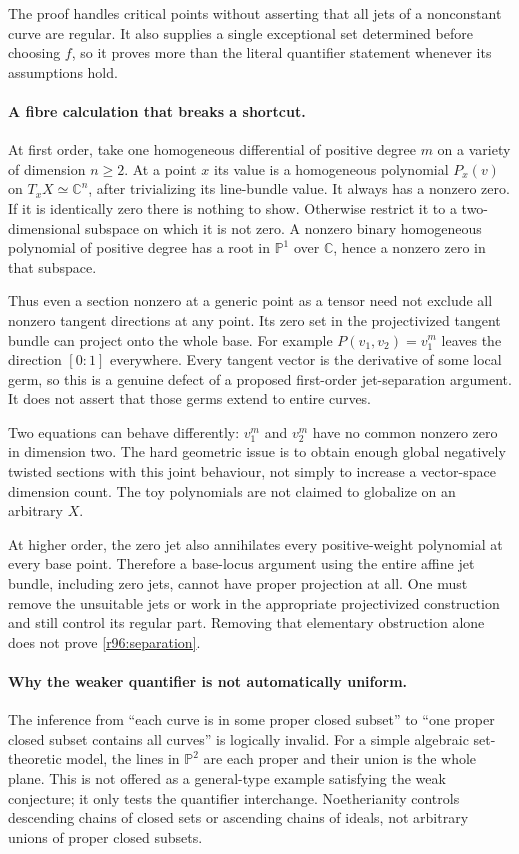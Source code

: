 \documentclass[11pt]{article}
\begin{document}
The proof handles critical points without asserting that all jets of a
nonconstant curve are regular. It also supplies a single exceptional
set determined before choosing $f$, so it proves more than the literal
quantifier statement whenever its assumptions hold.

\paragraph{A fibre calculation that breaks a shortcut.}
At first order, take one homogeneous differential of positive degree
$m$ on a variety of dimension $n\ge2$. At a point $x$ its value is a
homogeneous polynomial $P_x(v)$ on $T_xX\simeq\mathbb C^n$, after
trivializing its line-bundle value. It always has a nonzero zero. If it
is identically zero there is nothing to show. Otherwise restrict it to
a two-dimensional subspace on which it is not zero. A nonzero binary
homogeneous polynomial of positive degree has a root in $\mathbb P^1$
over $\mathbb C$, hence a nonzero zero in that subspace.

Thus even a section nonzero at a generic point as a tensor need not
exclude all nonzero tangent directions at any point. Its zero set in
the projectivized tangent bundle can project onto the whole base.
For example $P(v_1,v_2)=v_1^m$ leaves the direction $[0:1]$ everywhere.
Every tangent vector is the derivative of some local germ, so this is
a genuine defect of a proposed first-order jet-separation argument.
It does not assert that those germs extend to entire curves.

Two equations can behave differently: $v_1^m$ and $v_2^m$ have no
common nonzero zero in dimension two. The hard geometric issue is to
obtain enough global negatively twisted sections with this joint
behaviour, not simply to increase a vector-space dimension count.
The toy polynomials are not claimed to globalize on an arbitrary $X$.

At higher order, the zero jet also annihilates every positive-weight
polynomial at every base point. Therefore a base-locus argument using
the entire affine jet bundle, including zero jets, cannot have proper
projection at all. One must remove the unsuitable jets or work in the
appropriate projectivized construction and still control its regular
part. Removing that elementary obstruction alone does not prove
\eqref{r96:separation}.

\paragraph{Why the weaker quantifier is not automatically uniform.}
The inference from ``each curve is in some proper closed subset'' to
``one proper closed subset contains all curves'' is logically invalid.
For a simple algebraic set-theoretic model, the lines in $\mathbb P^2$
are each proper and their union is the whole plane. This is not offered
as a general-type example satisfying the weak conjecture; it only tests
the quantifier interchange. Noetherianity controls descending chains
of closed sets or ascending chains of ideals, not arbitrary unions of
proper closed subsets.
\end{document}
